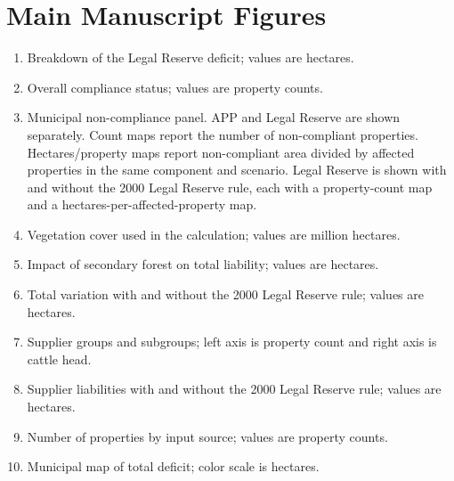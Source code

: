 \documentclass[12pt]{article}
\begin{document}
\section*{Main Manuscript Figures}
\begin{enumerate}
\item Breakdown of the Legal Reserve deficit; values are hectares.
\item Overall compliance status; values are property counts.
\item Municipal non-compliance panel. APP and Legal Reserve are shown separately. Count maps report the number of non-compliant properties. Hectares/property maps report non-compliant area divided by affected properties in the same component and scenario. Legal Reserve is shown with and without the 2000 Legal Reserve rule, each with a property-count map and a hectares-per-affected-property map.
\item Vegetation cover used in the calculation; values are million hectares.
\item Impact of secondary forest on total liability; values are hectares.
\item Total variation with and without the 2000 Legal Reserve rule; values are hectares.
\item Supplier groups and subgroups; left axis is property count and right axis is cattle head.
\item Supplier liabilities with and without the 2000 Legal Reserve rule; values are hectares.
\item Number of properties by input source; values are property counts.
\item Municipal map of total deficit; color scale is hectares.
\end{enumerate}
\clearpage
\end{document}
